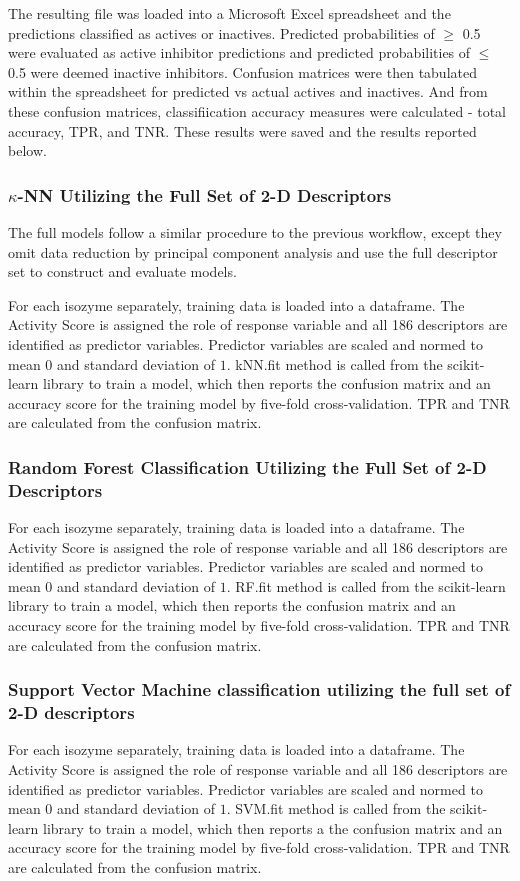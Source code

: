 The resulting file was loaded into a Microsoft Excel spreadsheet and the predictions classified as actives or inactives. Predicted probabilities of $\geq$ 0.5 were evaluated as active inhibitor predictions and predicted probabilities of $\le$ 0.5 were deemed inactive inhibitors. Confusion matrices were then tabulated within the spreadsheet for predicted vs actual actives and inactives. And from these confusion matrices, classifiication accuracy measures were calculated - total accuracy, TPR, and TNR. These results were saved and the results reported below.

\subsubsection{$\kappa$-NN Utilizing the Full Set of 2-D Descriptors}
The full models follow a similar procedure to the previous workflow, except they omit data reduction by principal component analysis and use the full descriptor set to construct and evaluate models. 

For each isozyme separately, training data is loaded into a dataframe. The Activity Score is assigned the role of response variable and all 186 descriptors are identified as predictor variables. Predictor variables are scaled and normed to mean $0$ and standard deviation of $1$. kNN.fit method is called from the scikit-learn library to train a model, which then reports the confusion matrix and an accuracy score for the training model by five-fold cross-validation. TPR and TNR are calculated from the confusion matrix.

\subsubsection{Random Forest Classification Utilizing the Full Set of 2-D Descriptors}
For each isozyme separately, training data is loaded into a dataframe. The Activity Score is assigned the role of response variable and all 186 descriptors are identified as predictor variables. Predictor variables are scaled and normed to mean $0$ and standard deviation of $1$. RF.fit method is called from the scikit-learn library to train a model, which then reports the confusion matrix and an accuracy score for the training model by five-fold cross-validation. TPR and TNR are calculated from the confusion matrix.

\subsubsection{Support Vector Machine classification utilizing the full set of 2-D descriptors}
For each isozyme separately, training data is loaded into a dataframe. The Activity Score is assigned the role of response variable and all 186  descriptors are identified as predictor variables. Predictor variables are scaled and normed to mean $0$ and standard deviation of $1$. SVM.fit method is called from the scikit-learn library to train a model, which then reports a the confusion matrix and an accuracy score for the training model by five-fold cross-validation. TPR and TNR are calculated from the confusion matrix.

